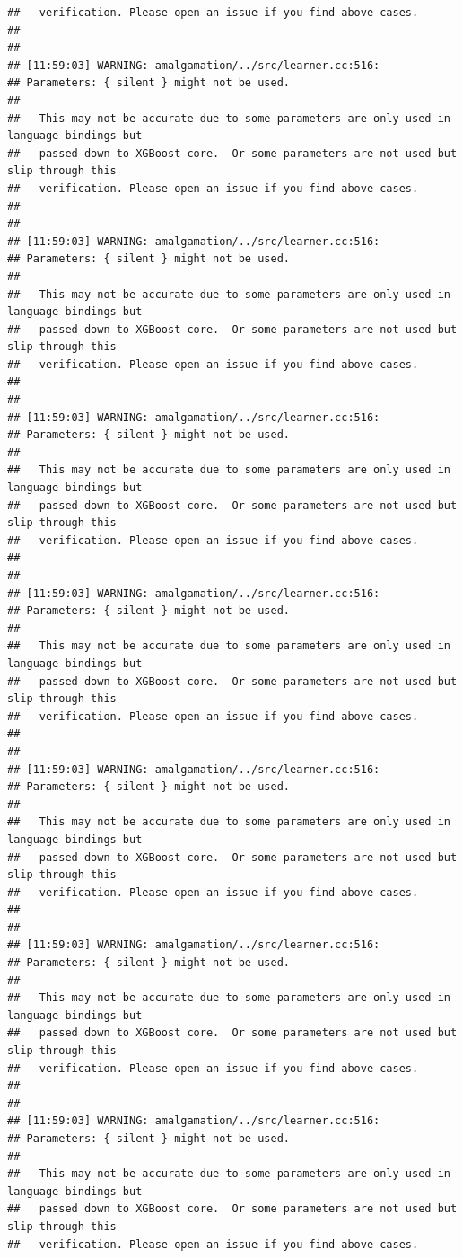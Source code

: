 \documentclass[AMS,STIX2COL]{WileyNJD-v2}\usepackage[]{graphicx}\usepackage[]{color}
\makeatletter
\newenvironment{kframe}{%
 \def\at@end@of@kframe{}%
 \ifinner\ifhmode%
  \def\at@end@of@kframe{\end{minipage}}%
  \begin{minipage}{\columnwidth}%
 \fi\fi%
 \def\FrameCommand##1{\hskip\@totalleftmargin \hskip-\fboxsep
 \colorbox{shadecolor}{##1}\hskip-\fboxsep
     \hskip-\linewidth \hskip-\@totalleftmargin \hskip\columnwidth}%
 \MakeFramed {\advance\hsize-\width
   \@totalleftmargin\z@ \linewidth\hsize
   \@setminipage}}%
 {\par\unskip\endMakeFramed%
 \at@end@of@kframe}
\newenvironment{knitrout}{}{} %
\makeatother
\begin{document}
\begin{knitrout}
\begin{kframe}
\begin{verbatim}
##   verification. Please open an issue if you find above cases.
## 
## 
## [11:59:03] WARNING: amalgamation/../src/learner.cc:516: 
## Parameters: { silent } might not be used.
## 
##   This may not be accurate due to some parameters are only used in language bindings but
##   passed down to XGBoost core.  Or some parameters are not used but slip through this
##   verification. Please open an issue if you find above cases.
## 
## 
## [11:59:03] WARNING: amalgamation/../src/learner.cc:516: 
## Parameters: { silent } might not be used.
## 
##   This may not be accurate due to some parameters are only used in language bindings but
##   passed down to XGBoost core.  Or some parameters are not used but slip through this
##   verification. Please open an issue if you find above cases.
## 
## 
## [11:59:03] WARNING: amalgamation/../src/learner.cc:516: 
## Parameters: { silent } might not be used.
## 
##   This may not be accurate due to some parameters are only used in language bindings but
##   passed down to XGBoost core.  Or some parameters are not used but slip through this
##   verification. Please open an issue if you find above cases.
## 
## 
## [11:59:03] WARNING: amalgamation/../src/learner.cc:516: 
## Parameters: { silent } might not be used.
## 
##   This may not be accurate due to some parameters are only used in language bindings but
##   passed down to XGBoost core.  Or some parameters are not used but slip through this
##   verification. Please open an issue if you find above cases.
## 
## 
## [11:59:03] WARNING: amalgamation/../src/learner.cc:516: 
## Parameters: { silent } might not be used.
## 
##   This may not be accurate due to some parameters are only used in language bindings but
##   passed down to XGBoost core.  Or some parameters are not used but slip through this
##   verification. Please open an issue if you find above cases.
## 
## 
## [11:59:03] WARNING: amalgamation/../src/learner.cc:516: 
## Parameters: { silent } might not be used.
## 
##   This may not be accurate due to some parameters are only used in language bindings but
##   passed down to XGBoost core.  Or some parameters are not used but slip through this
##   verification. Please open an issue if you find above cases.
## 
## 
## [11:59:03] WARNING: amalgamation/../src/learner.cc:516: 
## Parameters: { silent } might not be used.
## 
##   This may not be accurate due to some parameters are only used in language bindings but
##   passed down to XGBoost core.  Or some parameters are not used but slip through this
##   verification. Please open an issue if you find above cases.

\end{verbatim}
\end{kframe}
\end{knitrout}
\end{document}

